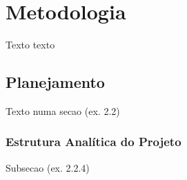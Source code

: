
\chapter{Metodologia}\label{cap-metodologia}

Texto texto

\section{Planejamento}\label{sec-planejamento}

Texto numa secao (ex. 2.2)

\subsection{Estrutura Analítica do Projeto}\label{subsec-eap}

Subsecao (ex. 2.2.4)